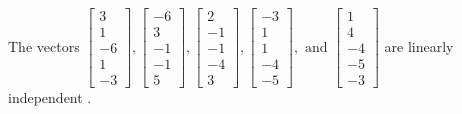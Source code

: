 \begin{exercise}
\begin{exerciseStatement}
  \end{exerciseStatement}
  \begin{exerciseAnswer}
   The vectors \(\left[\begin{array}{r}
3 \\
1 \\
-6 \\
1 \\
-3
\end{array}\right] , \left[\begin{array}{r}
-6 \\
3 \\
-1 \\
-1 \\
5
\end{array}\right] , \left[\begin{array}{r}
2 \\
-1 \\
-1 \\
-4 \\
3
\end{array}\right] , \left[\begin{array}{r}
-3 \\
1 \\
1 \\
-4 \\
-5
\end{array}\right] , \text{ and } \left[\begin{array}{r}
1 \\
4 \\
-4 \\
-5 \\
-3
\end{array}\right]\) are 
  	 linearly independent  .
  


  \end{exerciseAnswer}
\end{exercise}